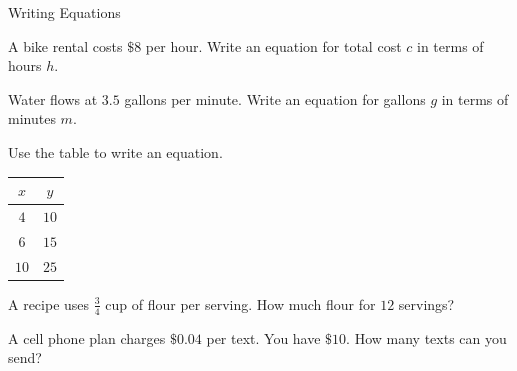 \begin{practiceBox}{Writing Equations}
\resetProblems

\prob A bike rental costs $\$8$ per hour. Write an equation for total cost $c$ in terms of hours $h$.

\prob Water flows at $3.5$ gallons per minute. Write an equation for gallons $g$ in terms of minutes $m$.

\prob Use the table to write an equation.
\begin{center}
\begin{tabular}{|c|c|}
\hline $x$ & $y$ \\ \hline $4$ & $10$ \\ $6$ & $15$ \\ $10$ & $25$ \\ \hline
\end{tabular}
\end{center}

\prob A recipe uses $\frac{3}{4}$ cup of flour per serving. How much flour for $12$ servings?

\prob A cell phone plan charges $\$0.04$ per text. You have $\$10$. How many texts can you send?

\end{practiceBox}
